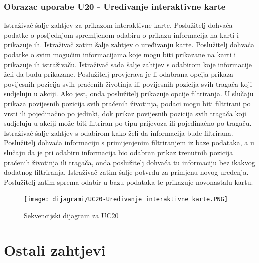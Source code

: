 \begin{packed_item}
\begin{packed_item}
				\subsubsection{Obrazac uporabe U20 - Uređivanje interaktivne karte}
				Istraživač šalje zahtjev za prikazom interaktivne karte. Poslužitelj dohvaća podatke o posljednjom spremljenom odabiru o prikazu informacija na karti i prikazuje ih. Istraživač zatim šalje zahtjev o uređivanju karte. Poslužitelj dohvaća podatke o svim mogućim informacijama koje mogu biti prikazane na karti i prikazuje ih istraživaču. Istraživač sada šalje zahtjev s odabirom koje informacije želi da budu prikazane. Poslužitelj provjerava je li odabrana opcija prikaza povijesnih pozicija svih praćenih životinja ili povijesnih pozicija svih tragača koji sudjeluju u akciji. Ako jest, onda poslužitelj prikazuje opcije filtriranja. U slučaju prikaza povijesnih pozicija svih praćenih životinja, podaci mogu biti filtrirani po vrsti ili pojedinačno po jedinki, dok prikaz povijesnih pozicija svih tragača koji sudjeluju u akciji može biti filtriran po tipu prijevoza ili pojedinačno po tragaču. Istraživač šalje zahtjev s odabirom kako želi da informacija bude filtrirana. Poslužitelj dohvaća informaciju s primijenjenim filtriranjem iz baze podataka, a u slučaju da je pri odabiru informacija bio odabran prikaz trenutnih pozicija praćenih životinja ili tragača, onda poslužitelj dohvaća tu informaciju bez ikakvog dodatnog filtriranja. Istraživač zatim šalje potvrdu za primjenu novog uređenja. Poslužitelj zatim sprema odabir u bazu podataka te prikazuje novonastalu kartu.
				\eject
				\begin{figure}[H]
					\texttt{[image: dijagrami/UC20-Uređivanje interaktivne karte.PNG]} 
					\centering
					\caption{Sekvencijski dijagram za UC20}
					\label{fig:promjene}
				\end{figure}
				
			\eject
		\section{Ostali zahtjevi}
		

\end{packed_item}
\end{packed_item}
